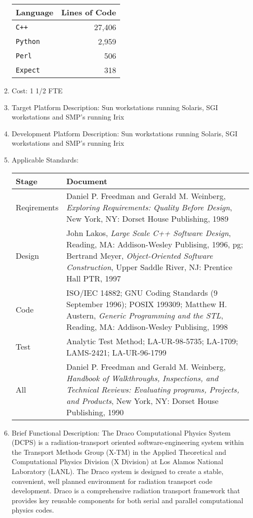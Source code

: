 \begin{enumerate}
\begin{center}
\begin{tabular}{l|r}
Language & Lines of Code \\ \hline
{\tt C++} & 27,406 \\
{\tt Python} & 2,959 \\
{\tt Perl} & 506 \\
{\tt Expect} & 318
\end{tabular}
\end{center}
\item Cost: 1 1/2 FTE
\item Target Platform Description: Sun workstations running Solaris,
SGI workstations and SMP's running Irix
\item Development Platform Description: Sun workstations running Solaris,
SGI workstations and SMP's running Irix
\item Applicable Standards:
\begin{center}
\begin{tabular}{l|p{3in}}
Stage & Document \\ \hline
Reqirements & Daniel P. Freedman and Gerald M. Weinberg, {\em
              Exploring Requirements: Quality Before Design}, New
              York, NY: Dorset House Publishing, 1989\\ 
Design      & John Lakos, {\em Large Scale C++ Software Design},
              Reading, MA: Addison-Wesley Publising, 1996, pg;
              Bertrand Meyer, {\em Object-Oriented Software
              Construction}, Upper Saddle River, NJ: Prentice Hall
	      PTR, 1997\\
Code        & ISO/IEC 14882; 
              GNU Coding Standards (9 September 1996);
              POSIX 199309;
              Matthew H. Austern, {\em Generic Programming and the
              STL}, Reading, MA: Addison-Wesley Publising, 1998\\
Test        & Analytic Test Method; LA-UR-98-5735; LA-1709; LAMS-2421;
              LA-UR-96-1799 \\ 
All         & Daniel P. Freedman and Gerald M. Weinberg, {\em Handbook
              of Walkthroughs, Inspections, and Technical Reviews:
              Evaluating programs, Projects, and Products}, New
              York, NY: Dorset House Publishing, 1990
\end{tabular}
\end{center}
\item Brief Functional Description: The Draco Computational Physics
System (DCPS) is a radiation-transport oriented software-engineering
system within the Transport Methods Group (X-TM) in the Applied
Theoretical and Computational Physics Division (X Division) at Los
Alamos National Laboratory (LANL). The Draco system is designed to
create a stable, convenient, well planned environment for radiation
transport code development. Draco is a comprehensive radiation
transport framework that provides key reusable components for both
serial and parallel computational physics codes.
\end{enumerate}
